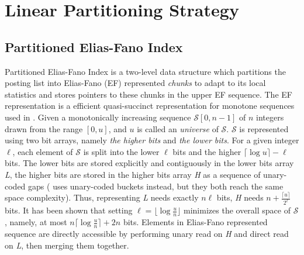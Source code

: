 \documentclass[runningheads,a4paper]{llncs}
\begin{document}
\section{Linear Partitioning Strategy}\label{sec:our method}
\subsection{Partitioned Elias-Fano Index}

Partitioned Elias-Fano Index is a two-level data structure which partitions the posting list into Elias-Fano (EF) represented \textit{chunks} to adapt to its local statistics and stores pointers to these chunks in the upper EF sequence.
The EF representation is a efficient quasi-succinct representation for monotone sequences used in \cite{elias1974efficient,vigna2013quasi}.
Given a monotonically increasing sequence $ \mathcal{S}[0,n-1] $ of $ n $ integers drawn from the range $ [0,u] $, and $ u $ is called an \textit{universe} of $ \mathcal{S} $.
$ \mathcal{S} $ is represented using two bit arrays, namely \textit{the higher bits} and \textit{the lower bits}.
For a given integer $ \ell $, each element of $ \mathcal{S} $ is split into the lower $ \ell $ bits and the higher $ \lceil \log u \rceil - \ell$ bits.
The lower bits are stored explicitly and contiguously in the lower bits array \textit{L}, the higher bits are stored in the higher bits array \textit{H} as a sequence of unary-coded gaps (\cite{ottaviano2014partitioned} uses unary-coded buckets instead, but they both reach the same space complexity).
Thus, representing \textit{L} needs exactly $ n\ell $ bits, \textit{H} needs $ n + \frac{\lceil u \rceil}{2^{\ell}} $ bits.
It has been shown that setting $ \ell = \lfloor \log \frac{u}{n} \rfloor $ minimizes the overall space of $ \mathcal{S} $, namely, at most $ n \lceil \log \frac{u}{n} \rceil + 2 n $ bits.
Elements in Elias-Fano represented sequence are directly accessible by performing unary read on \textit{H} and direct read on \textit{L}, then merging them together.
\end{document}
